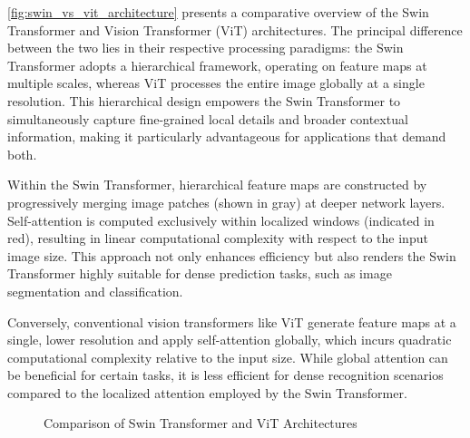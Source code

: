 \autoref{fig:swin_vs_vit_architecture} presents a comparative overview of the Swin Transformer and Vision Transformer (ViT) architectures. The principal difference between the two lies in their respective processing paradigms: the Swin Transformer adopts a hierarchical framework, operating on feature maps at multiple scales, whereas ViT processes the entire image globally at a single resolution. This hierarchical design empowers the Swin Transformer to simultaneously capture fine-grained local details and broader contextual information, making it particularly advantageous for applications that demand both.

Within the Swin Transformer, hierarchical feature maps are constructed by progressively merging image patches (shown in gray) at deeper network layers. Self-attention is computed exclusively within localized windows (indicated in red), resulting in linear computational complexity with respect to the input image size. This approach not only enhances efficiency but also renders the Swin Transformer highly suitable for dense prediction tasks, such as image segmentation and classification.

Conversely, conventional vision transformers like ViT generate feature maps at a single, lower resolution and apply self-attention globally, which incurs quadratic computational complexity relative to the input size. While global attention can be beneficial for certain tasks, it is less efficient for dense recognition scenarios compared to the localized attention employed by the Swin Transformer.

\begin{figure}[htbp]
    \centering
    \caption{Comparison of Swin Transformer and ViT Architectures}
    \label{fig:swin_vs_vit_architecture}
\end{figure}

